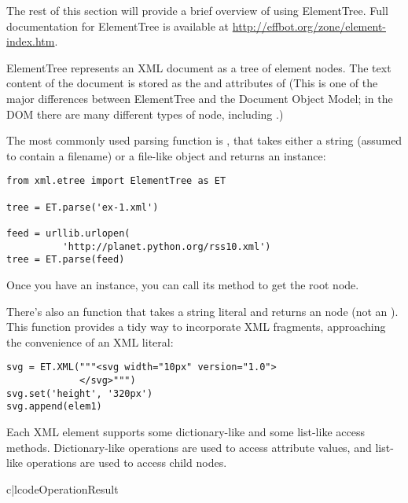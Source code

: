 \documentclass{howto}
\begin{document}
The rest of this section will provide a brief overview of using
ElementTree.  Full documentation for ElementTree is available at
\url{http://effbot.org/zone/element-index.htm}.

ElementTree represents an XML document as a tree of element nodes.
The text content of the document is stored as the 
and  attributes of 
(This is one of the major differences between ElementTree and 
the Document Object Model; in the DOM there are many different
types of node, including .)

The most commonly used parsing function is , that
takes either a string (assumed to contain a filename) or a file-like
object and returns an  instance:

\begin{verbatim}
from xml.etree import ElementTree as ET

tree = ET.parse('ex-1.xml')

feed = urllib.urlopen(
          'http://planet.python.org/rss10.xml')
tree = ET.parse(feed)
\end{verbatim}

Once you have an  instance, you
can call its  method to get the root  node.

There's also an  function that takes a string literal
and returns an  node (not an ).  
This function provides a tidy way to incorporate XML fragments,
approaching the convenience of an XML literal:

\begin{verbatim}
svg = ET.XML("""<svg width="10px" version="1.0">
             </svg>""")
svg.set('height', '320px')
svg.append(elem1)
\end{verbatim}

Each XML element supports some dictionary-like and some list-like
access methods.  Dictionary-like operations are used to access attribute
values, and list-like operations are used to access child nodes.

\begin{tableii}{c|l}{code}{Operation}{Result}
\end{tableii}
\end{document}
